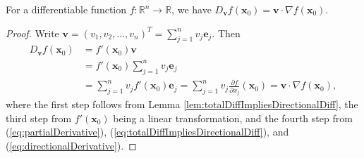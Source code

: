 \begin{coro}
  \label{coro:directionalDiffInRange1D}
  For a differentiable function
  $f: \mathbb{R}^n\rightarrow \mathbb{R}$,
  we have
  $D_{\mathbf{v}} f(\mathbf{x}_0) = \mathbf{v}\cdot \nabla f(\mathbf{x}_0)$.
\end{coro}
\begin{proof}
  Write $\mathbf{v}=(v_1, v_2, \ldots, v_n)^T=\sum_{j=1}^{n}
  v_j \mathbf{e}_j$. Then
  \begin{align*}
    D_{\mathbf{v}}f(\mathbf{x}_{0})
    &=f'(\mathbf{x}_{0})\mathbf{v}\\
    &=f'(\mathbf{x}_{0})\sum_{j=1}^{n}v_{j}\mathbf{e}_{j}\\
    &=\sum_{j=1}^{n}v_{j}f'(\mathbf{x}_{0})\mathbf{e}_{j}
      =\sum_{j=1}^{n}v_{j}
      \frac{\partial f}{\partial x_{j}}(\mathbf{x}_{0})
      =\mathbf{v}\cdot \nabla f(\mathbf{x}_{0}),
  \end{align*}
  where the first step follows from Lemma
  \ref{lem:totalDiffImpliesDirectionalDiff},
  the third step from $f'(\mathbf{x}_0)$
  being a linear transformation,
  and the fourth step from (\ref{eq:partialDerivative}),
  (\ref{eq:totalDiffImpliesDirectionalDiff}), and
  (\ref{eq:directionalDerivative}).
\end{proof}


